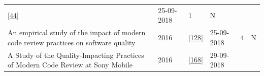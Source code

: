 \documentclass[]{book}
\begin{document}
\begin{longtable}[]{@{}llllll@{}}
\begin{minipage}[t]{0.13\columnwidth}
{[}\protect\hyperlink{ref-cohen2010modern}{44}{]}\strut
\end{minipage} & \begin{minipage}[t]{0.06\columnwidth}\raggedright\strut
25-09-2018\strut
\end{minipage} & \begin{minipage}[t]{0.07\columnwidth}\raggedright\strut
1\strut
\end{minipage} & \begin{minipage}[t]{0.08\columnwidth}\raggedright\strut
N\strut
\end{minipage}\tabularnewline
\begin{minipage}[t]{0.47\columnwidth}\raggedright\strut
An empirical study of the impact of modern code review practices on
software quality\strut
\end{minipage} & \begin{minipage}[t]{0.03\columnwidth}\raggedright\strut
2016\strut
\end{minipage} & \begin{minipage}[t]{0.13\columnwidth}\raggedright\strut
{[}\protect\hyperlink{ref-mcintosh2016empirical}{128}{]}\strut
\end{minipage} & \begin{minipage}[t]{0.06\columnwidth}\raggedright\strut
25-09-2018\strut
\end{minipage} & \begin{minipage}[t]{0.07\columnwidth}\raggedright\strut
4\strut
\end{minipage} & \begin{minipage}[t]{0.08\columnwidth}\raggedright\strut
N\strut
\end{minipage}\tabularnewline
\begin{minipage}[t]{0.47\columnwidth}\raggedright\strut
A Study of the Quality-Impacting Practices of Modern Code Review at Sony
Mobile\strut
\end{minipage} & \begin{minipage}[t]{0.03\columnwidth}\raggedright\strut
2016\strut
\end{minipage} & \begin{minipage}[t]{0.13\columnwidth}\raggedright\strut
{[}\protect\hyperlink{ref-shimagaki2016study}{168}{]}\strut
\end{minipage} & \begin{minipage}[t]{0.06\columnwidth}\raggedright\strut
29-09-2018\strut
\end{minipage} & \begin{minipage}[t]{0.07\columnwidth}\raggedright\strut

\end{minipage}
\end{longtable}
\end{document}
